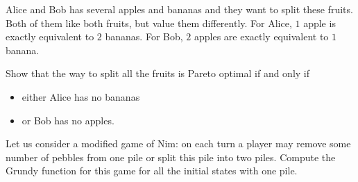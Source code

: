 \documentclass[addpoints,answers]{exam}
\begin{document}
    \pagestyle{headandfoot}
    \runningheadrule

    \firstpagefooter{}{}{}
    \runningfooter{}{}{}
    \begin{flushright}

        \vspace{0.2in}

    \end{flushright}

    \begin{questions}
        \question
            Alice and Bob has several apples and bananas and they want to split these
            fruits. Both of them like both fruits, but value them differently. For Alice,
            $1$ apple is exactly equivalent to $2$ bananas. For Bob, $2$ apples are exactly
            equivalent to $1$ banana.
            
            Show that the way to split all the fruits is Pareto optimal if and only if
            \begin{itemize}
                \item either Alice has no bananas
                \item or Bob has no apples.
            \end{itemize}
            \begin{solutionorbox}[\stretch{1}]
            \end{solutionorbox}
            \newpage
        \question
            Let us consider a modified game of Nim: on each turn a player may remove some
            number of pebbles from one pile or split this pile into two piles. Compute the
            Grundy function for this game for all the initial states with one pile.
            \begin{solutionorbox}[\stretch{1}]
            \end{solutionorbox}
            \newpage
\end{questions}
\end{document}
